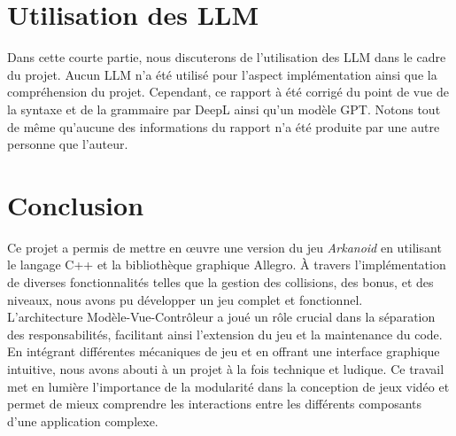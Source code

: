 \documentclass{article}
\begin{document}
\section{Utilisation des LLM}

\noindent Dans cette courte partie, nous discuterons de l'utilisation des LLM dans le cadre du projet. Aucun LLM n'a été utilisé pour l'aspect implémentation ainsi que la compréhension du projet. Cependant, ce rapport à été corrigé du point de vue de la syntaxe et de la grammaire par DeepL ainsi qu'un modèle GPT. Notons tout de même qu'aucune des informations du rapport n'a été produite par une autre personne que l'auteur.

\section{Conclusion}

\noindent Ce projet a permis de mettre en œuvre une version du jeu \textit{Arkanoid} en utilisant le langage C++ et la bibliothèque graphique Allegro. À travers l'implémentation de diverses fonctionnalités telles que la gestion des collisions, des bonus, et des niveaux, nous avons pu développer un jeu complet et fonctionnel. \\

\noindent L'architecture Modèle-Vue-Contrôleur a joué un rôle crucial dans la séparation des responsabilités, facilitant ainsi l'extension du jeu et la maintenance du code. En intégrant différentes mécaniques de jeu et en offrant une interface graphique intuitive, nous avons abouti à un projet à la fois technique et ludique. Ce travail met en lumière l'importance de la modularité dans la conception de jeux vidéo et permet de mieux comprendre les interactions entre les différents composants d'une application complexe.
\end{document}
